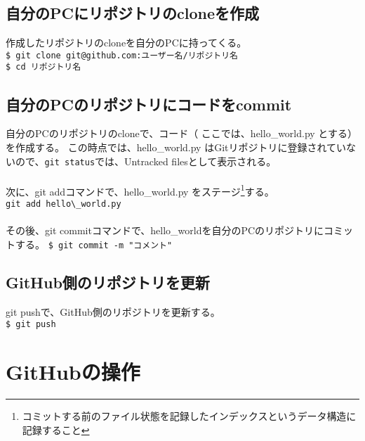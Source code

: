 \documentclass[11pt, oneside]{article}   	%
\begin{document}
\subsection{自分のPCにリポジトリのcloneを作成}
作成したリポジトリのcloneを自分のPCに持ってくる。\\
\verb|$ git clone git@github.com:ユーザー名/リポジトリ名|\\
\verb|$ cd リポジトリ名|\\

\subsection{自分のPCのリポジトリにコードをcommit}
自分のPCのリポジトリのcloneで、コード（ ここでは、hello\_world.py とする）を作成する。
この時点では、hello\_world.py はGitリポジトリに登録されていないので、\verb|git status|では、Untracked filesとして表示される。\\
　\\
次に、git addコマンドで、hello\_world.py をステージ\footnote{コミットする前のファイル状態を記録したインデックスというデータ構造に記録すること}する。\\
\verb|git add hello\_world.py|\\
　\\
その後、git commitコマンドで、hello\_worldを自分のPCのリポジトリにコミットする。
\verb|$ git commit -m "コメント"|\\

\subsection{GitHub側のリポジトリを更新}
git pushで、GitHub側のリポジトリを更新する。\\
\verb|$ git push|\\


\section{GitHubの操作}
\end{document}
